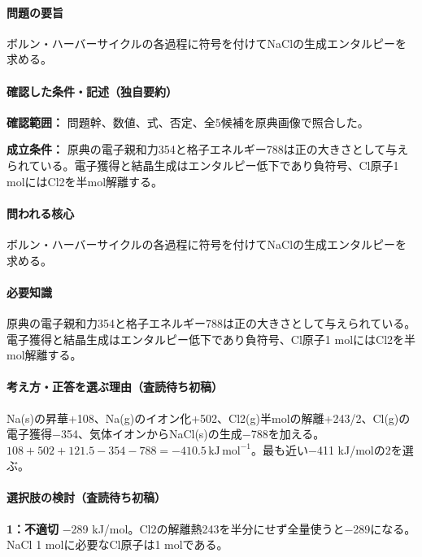 \paragraph{問題の要旨} ボルン・ハーバーサイクルの各過程に符号を付けてNaClの生成エンタルピーを求める。

\paragraph{確認した条件・記述（独自要約）}\mbox{}\par

\noindent\textbf{確認範囲：} 問題幹、数値、式、否定、全5候補を原典画像で照合した。\par

\noindent\textbf{成立条件：} 原典の電子親和力354と格子エネルギー788は正の大きさとして与えられている。電子獲得と結晶生成はエンタルピー低下であり負符号、Cl原子1 molにはCl2を半mol解離する。\par

\paragraph{問われる核心} ボルン・ハーバーサイクルの各過程に符号を付けてNaClの生成エンタルピーを求める。

\paragraph{必要知識} 原典の電子親和力354と格子エネルギー788は正の大きさとして与えられている。電子獲得と結晶生成はエンタルピー低下であり負符号、Cl原子1 molにはCl2を半mol解離する。

\paragraph{考え方・正答を選ぶ理由（査読待ち初稿）} Na(s)の昇華+108、Na(g)のイオン化+502、Cl2(g)半molの解離+243/2、Cl(g)の電子獲得−354、気体イオンからNaCl(s)の生成−788を加える。\(108+502+121.5-354-788=-410.5\,\mathrm{kJ\,mol^{-1}}\)。最も近い−411 kJ/molの2を選ぶ。

\paragraph{選択肢の検討（査読待ち初稿）}\mbox{}\par

\noindent\textbf{1：不適切} −289 kJ/mol。Cl2の解離熱243を半分にせず全量使うと−289になる。NaCl 1 molに必要なCl原子は1 molである。\par

